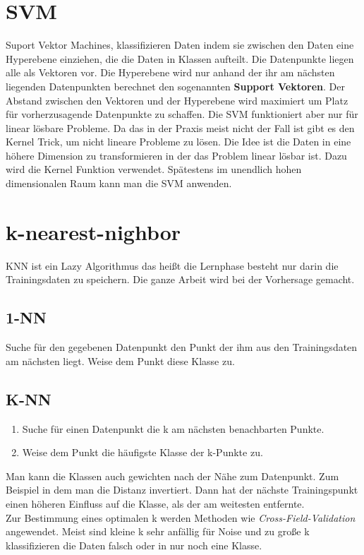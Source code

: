 \documentclass[a4paper]{scrartcl}
\begin{document}
\section{SVM}
Suport Vektor Machines, klassifizieren Daten indem sie zwischen den Daten eine Hyperebene einziehen, die die Daten in Klassen aufteilt. Die Datenpunkte liegen alle als Vektoren vor. Die Hyperebene wird nur anhand der ihr am nächsten liegenden Datenpunkten berechnet den sogenannten \textbf{Support Vektoren}. Der Abstand zwischen den Vektoren und der Hyperebene wird maximiert um Platz für vorherzusagende Datenpunkte zu schaffen. Die SVM funktioniert aber nur für linear lösbare Probleme. Da das in der Praxis meist nicht der Fall ist gibt es den Kernel Trick, um nicht lineare Probleme zu lösen. Die Idee ist die Daten in eine höhere Dimension zu transformieren in der das Problem linear lösbar ist. Dazu wird die Kernel Funktion verwendet. Spätestens im unendlich hohen dimensionalen Raum kann man die SVM anwenden.

\section{k-nearest-nighbor}
KNN ist ein Lazy Algorithmus das heißt die Lernphase besteht nur darin die Trainingsdaten zu speichern. Die ganze Arbeit wird bei der Vorhersage gemacht.

\subsection{1-NN} 
Suche für den gegebenen Datenpunkt den Punkt der ihm aus den Trainingsdaten am nächsten liegt. Weise dem Punkt diese Klasse zu. 

\subsection{K-NN}
\begin{enumerate}
\item Suche für einen Datenpunkt die k am nächsten benachbarten Punkte.
\item Weise dem Punkt die häufigste Klasse der k-Punkte zu.
\end{enumerate}
Man kann die Klassen auch gewichten nach der Nähe zum Datenpunkt. Zum Beispiel in dem man die Distanz invertiert. Dann hat der nächste Trainingspunkt einen höheren Einfluss auf die Klasse, als der am weitesten entfernte.\\
Zur Bestimmung eines optimalen k werden Methoden wie \textit{Cross-Field-Validation} angewendet. Meist sind kleine k sehr anfällig für Noise und zu große k klassifizieren die Daten falsch oder in nur noch eine Klasse.
\end{document}
